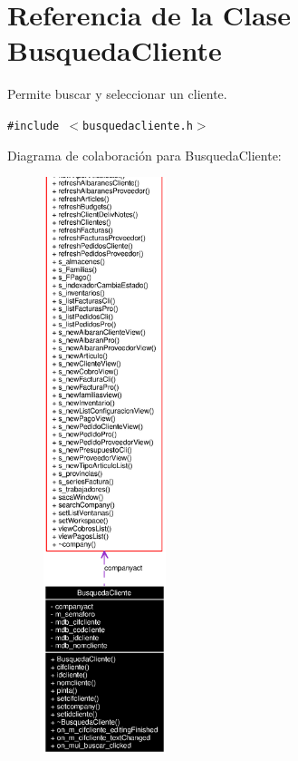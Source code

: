 \section{Referencia de la Clase Busqueda\-Cliente}
\label{classBusquedaCliente}
Permite buscar y seleccionar un cliente.  


{\tt \#include $<$busquedacliente.h$>$}

Diagrama de colaboraci\'{o}n para Busqueda\-Cliente:\begin{figure}[H]
\begin{center}
\leavevmode
\includegraphics[width=101pt]{classBusquedaCliente__coll__graph}
\end{center}
\end{figure}
